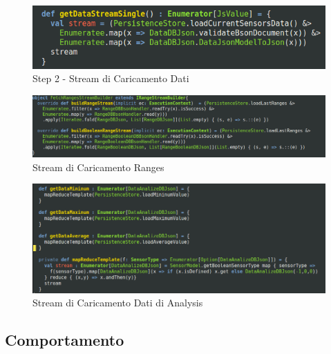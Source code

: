 \begin{figure}[h]
\centering
\includegraphics[scale=0.5,natwidth=610,natheight=642]{Figures/Project/Server/Interaction/LoadDataStream/LoadDataStream2.png}
\caption{Step 2 - Stream di Caricamento Dati}
\label{LoadDataStream2}
\end{figure}

\begin{figure}[h]
\centering
\includegraphics[scale=0.3,natwidth=610,natheight=642]{Figures/Project/Server/Interaction/RangeLoadStream/RangeLoadStream.png}
\caption{Stream di Caricamento Ranges}
\label{LoadRangeStream}
\end{figure}

\begin{figure}[h]
\centering
\includegraphics[scale=0.3,natwidth=610,natheight=642]{Figures/Project/Server/Interaction/AnalysisLoadStream/AnalysisLoadStream.png}
\caption{Stream di Caricamento Dati di Analysis}
\label{AnalysisRangeStream}
\end{figure}


\afterpage{\clearpage}

\newpage

\subsection{Comportamento}

